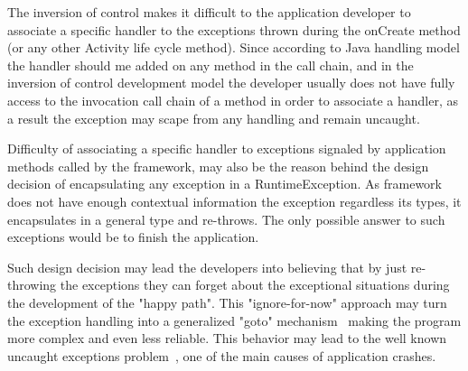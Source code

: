 \documentclass[conference]{IEEEtran}
\begin{document}
The inversion of control makes it difficult to the application developer to associate 
a specific handler to the exceptions thrown during the onCreate method (or any other Activity life cycle method).
Since according to Java handling model the handler should me added on any method in the call chain,
and in the inversion of control development model the developer usually does not have fully access to 
the invocation call chain of a method in order to associate a handler, as a result the 
exception may scape from any handling and remain uncaught.

Difficulty of associating a specific handler to exceptions signaled by application methods called by the framework,
may also be the reason behind the design decision of encapsulating any exception in a RuntimeException.
As framework does not have enough contextual information the exception regardless its types,
it encapsulates in a general type and re-throws. The only possible answer to such exceptions would be 
to finish the application.

Such design decision may lead the developers into believing that by just re-throwing 
the exceptions they can forget about the exceptional situations during the development of the "happy path". 
This "ignore-for-now" approach may turn the exception handling into a generalized "goto" mechanism~\cite{mandrioli1992advances}
 making the program more complex and even less reliable. This behavior may lead to the well known uncaught exceptions 
problem~\cite{jo2004uncaught}, one of the main causes of application crashes.  


\end{document}
